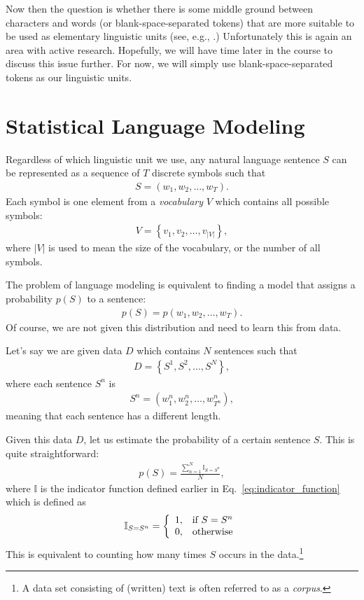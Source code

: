 \documentclass{report}
\newcommand{\II}[0]{\mathbb{I}}
\begin{document}
Now then the question is whether there is some middle ground between characters
and words (or blank-space-separated tokens) that are more suitable to be used as
elementary linguistic units (see, e.g., \cite{sennrich2015neural}.)
Unfortunately this is again an area with active research.  Hopefully, we will
have time later in the course to discuss this issue further.  For now, we will
simply use blank-space-separated tokens as our linguistic units.

\section{Statistical Language Modeling}
\label{sec:lm}

Regardless of which linguistic unit we use, any natural language sentence $S$
can be represented as a sequence of $T$ discrete symbols such that
\begin{align*}
    S = (w_1, w_2, \ldots, w_T).
\end{align*}
Each symbol is one element from a {\em vocabulary} $V$ which contains all
possible symbols:
\begin{align*}
    V = \left\{ v_1, v_2, \ldots, v_{|V|}\right\},
\end{align*}
where $|V|$ is used to mean the size of the vocabulary, or the number of all
symbols.

The problem of language modeling is equivalent to finding a model that assigns a
probability $p(S)$ to a sentence:
\begin{align}
    \label{eq:sentence_prob}
    p(S) = p(w_1, w_2, \ldots, w_T).
\end{align}
Of course, we are not given this distribution and need to learn this from data.

Let's say we are given data $D$ which contains $N$ sentences such that
\begin{align*}
    D = \left\{ S^1, S^2, \ldots, S^N \right\},
\end{align*}
where each sentence $S^n$ is 
\begin{align*}
    S^n = (w_1^n, w_2^n, \ldots, w_{T^n}^n),
\end{align*}
meaning that each sentence has a different length.

Given this data $D$, let us estimate the probability of a certain sentence $S$.
This is quite straightforward:
\begin{align}
    \label{eq:sentence_mle}
    p(S) = \frac{\sum_{n=1}^N \II_{S = S^n}}{N},
\end{align}
where $\II$ is the indicator function defined earlier in
Eq.~\eqref{eq:indicator_function} which is defined as
\begin{align*}
    \II_{S=S^n} = \left\{ 
        \begin{array}{c c}
            1, & \text{if }S=S^n \\
            0, & \text{otherwise}
        \end{array}
        \right.
\end{align*}
This is equivalent to counting how many times $S$ occurs in the data.\footnote{
    A data set consisting of (written) text is often referred to as a {\em
    corpus}. 
}
\end{document}
